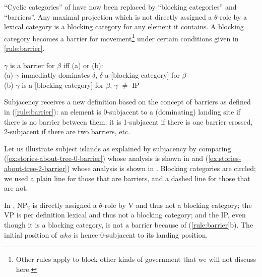 ``Cyclic categories'' of \citet{Chomsky.1973} have now been replaced by ``blocking categories'' and ``barriers''. Any maximal projection which is not directly assigned a $\theta$-role by a lexical category is a blocking category for any element it contains. A blocking category becomes a barrier for movement\footnote{Other rules apply to block other kinds of government that we will not discuss here.} under certain conditions given in \ref{rule:barrier}.%

\ea\label{rule:barrier}
$\gamma$ is a barrier for $\beta$ iff (a) or (b):\\
(a) $\gamma$ immediatly dominates $\delta$, $\delta$ a [blocking category] for $\beta$\\
(b) $\gamma$ is a [blocking category] for $\beta$, $\gamma$ $\neq$ IP
\z 

Subjacency receives a new definition based on the concept of barriers as defined in (\ref{rule:barrier}): an element is 0-subjacent to a (dominating) landing site if there is no barrier between them; it is 1-subjacent if there is one barrier crossed, 2-subjacent if there are two barriers, etc. 

Let us illustrate subject islands as explained by subjacency by comparing (\ref{ex:stories-about-tree-0-barrier}) whose analysis is shown in  and (\ref{ex:stories-about-tree-2-barrier}) whose analysis is shown in . Blocking categories are circled; we used a plain line for those that are barriers, and a dashed line for those that are not. 

\label{ex:stories-about-tree-2-barrier}
\z 

In , NP$_2$ is directly assigned a $\theta$-role by V and thus not a blocking category; the VP is per definition lexical and thus not a blocking category; and the IP, even though it is a blocking category, is not a barrier because of (\ref{rule:barrier}b). The initial position of \emph{who} is hence 0-subjacent to its landing position.

